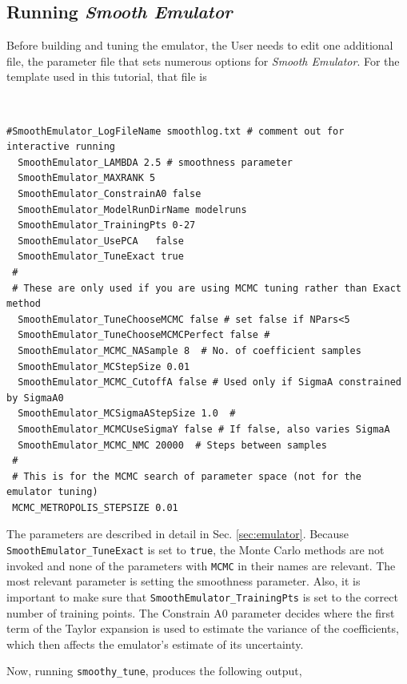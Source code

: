\documentclass[UserManual.tex]{subfiles}
\begin{document}
\subsection{Running {\it Smooth Emulator}}
Before building and tuning the emulator, the User needs to edit one additional file, the parameter file that sets numerous options for {\it Smooth Emulator}. For the template used in this tutorial, that file is
{\tt
\begin{verbatim}
#SmoothEmulator_LogFileName smoothlog.txt # comment out for interactive running
  SmoothEmulator_LAMBDA 2.5 # smoothness parameter
  SmoothEmulator_MAXRANK 5
  SmoothEmulator_ConstrainA0 false
  SmoothEmulator_ModelRunDirName modelruns
  SmoothEmulator_TrainingPts 0-27
  SmoothEmulator_UsePCA   false
  SmoothEmulator_TuneExact true
 #
 # These are only used if you are using MCMC tuning rather than Exact method
  SmoothEmulator_TuneChooseMCMC false # set false if NPars<5
  SmoothEmulator_TuneChooseMCMCPerfect false #
  SmoothEmulator_MCMC_NASample 8  # No. of coefficient samples
  SmoothEmulator_MCStepSize 0.01
  SmoothEmulator_MCMC_CutoffA false # Used only if SigmaA constrained by SigmaA0
  SmoothEmulator_MCSigmaAStepSize 1.0  #
  SmoothEmulator_MCMCUseSigmaY false # If false, also varies SigmaA
  SmoothEmulator_MCMC_NMC 20000  # Steps between samples 
 #
 # This is for the MCMC search of parameter space (not for the emulator tuning)
 MCMC_METROPOLIS_STEPSIZE 0.01
\end{verbatim}
}
The parameters are described in detail in Sec. \ref{sec:emulator}. Because {\tt SmoothEmulator\_TuneExact} is set to {\tt true}, the Monte Carlo methods are not invoked and none of the parameters with {\tt MCMC} in their names are relevant. The most relevant parameter is setting the smoothness parameter. Also, it is important to make sure that {\tt SmoothEmulator\_TrainingPts} is set to the correct number of training points. The Constrain A0 parameter decides where the first term of the Taylor expansion is used to estimate the variance of the coefficients, which then affects the emulator's estimate of its uncertainty.

Now, running {\tt smoothy\_tune}, produces the following output,
\end{document}
